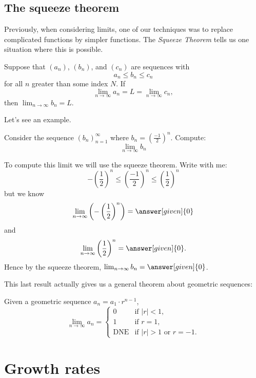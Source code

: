 \documentclass{ximera}
\begin{document}
\subsection{The squeeze theorem}

Previously, when considering limits, one of our techniques was to replace 
complicated functions by simpler functions. The \textit{Squeeze Theorem}
tells us one situation where this is possible.

\begin{theorem}
  Suppose that $(a_n)$, $(b_n)$, and $(c_n)$ are sequences with
  \[
  a_n \le b_n \le c_n
  \]
  for all $n$ greater than some index $N$. If
  \[
  \lim_{n\to\infty} a_n = L = \lim_{n\to\infty} c_n,
  \] 
  then $\lim_{n\to\infty} b_n = L$.
\end{theorem}

Let's see an example.

\begin{example}
  Consider the sequence $(b_n)_{n=1}^{\infty}$ where $b_n =
  \left(\frac{-1}{2}\right)^n$. Compute:
  \[
  \lim_{n\to\infty}b_n
  \]
  \begin{explanation}
    To compute this limit we will use the squeeze theorem. Write with
    me:
    \[
    -\left(\frac{1}{2}\right)^n\le \left(\frac{-1}{2}\right)^n \le \left(\frac{1}{2}\right)^n
    \]
    but we know
    \[
    \lim_{n\to \infty}\left(-\left(\frac{1}{2}\right)^n\right) = \answer[given]{0}
    \]
    and
    \[
    \lim_{n\to \infty}\left(\frac{1}{2}\right)^n =\answer[given]{0}.
    \]
    Hence by the squeeze theorem, $\lim_{n\to\infty} b_n = \answer[given]{0}$.
  \end{explanation}
\end{example}


This last result actually gives us a general theorem about geometric
sequences:

\begin{theorem}
  Given a geometric sequence $a_n = a_1 \cdot r^{n-1}$,
  \[
  \lim_{n\to\infty} a_n =
  \begin{cases}
    0 &\text{if $|r|<1$,}\\
    1 &\text{if $r=1$,}\\
    \text{DNE} &\text{if $|r|>1$ or $r=-1$.}
  \end{cases}
  \]
\end{theorem}


\section{Growth rates}
\end{document}
